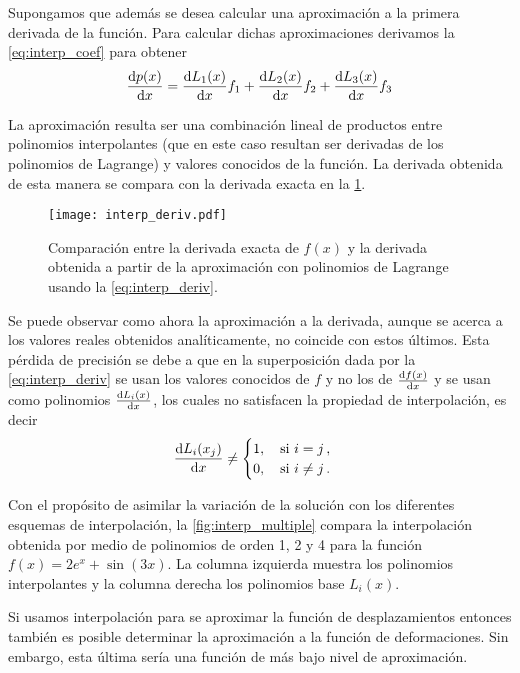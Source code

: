 Supongamos que además se desea calcular una aproximación a la primera derivada de la función. Para calcular dichas aproximaciones derivamos la \cref{eq:interp_coef} para obtener
\begin{equation}
  \dv{p(x)}{x} = \dv{L_1(x)}{x} f_1 + \dv{L_2(x)}{x} f_2 + \dv{L_3(x)}{x} 
  f_3
  \label{eq:interp_deriv}
\end{equation}

La aproximación resulta ser una combinación lineal de productos entre polinomios interpolantes (que en este caso resultan ser derivadas de los polinomios de Lagrange) y valores conocidos de la función. La derivada obtenida de esta manera se compara con la derivada exacta en la \cref{fig:interp_deriv}.

\begin{figure}[H]
  \centering
  \texttt{[image: interp\_deriv.pdf]}
  \caption{Comparación entre la derivada exacta de $f(x)$ y la derivada obtenida a partir de la aproximación con polinomios de Lagrange usando la \cref{eq:interp_deriv}.}
  \label{fig:interp_deriv}
\end{figure}

Se puede observar como ahora la aproximación a la derivada, aunque se acerca a 
los valores reales obtenidos analíticamente, no coincide con estos últimos. 
Esta pérdida de precisión se debe a que en la superposición dada por la 
\cref{eq:interp_deriv} se usan los valores conocidos de $f$ y no los de 
$\dv{f(x)}{x}$ y se usan como polinomios $\dv{L_i(x)}{x}$, los cuales no 
satisfacen la propiedad de interpolación, es decir
\[\dv{L_i(x_j)}{x} \neq \begin{cases}
1,\quad \text{si } i = j\, ,\\
0,\quad \text{si } i \neq j\, .
\end{cases}\]

Con el propósito de asimilar la variación de la solución con los diferentes 
esquemas de interpolación, la \cref{fig:interp_multiple} compara la  
interpolación obtenida por medio de polinomios de orden 1, 2 y 4 para la 
función $f(x) = 2e^{x} + \sin(3x)$. La columna izquierda muestra los polinomios 
interpolantes y la columna derecha los polinomios base $L_i (x)$.

\begin{tcolorbox}
Si usamos interpolación para se aproximar la función de desplazamientos 
entonces también es posible determinar la aproximación a la función de 
deformaciones. Sin embargo, esta última sería una función de más bajo nivel de 
aproximación.
\end{tcolorbox}

